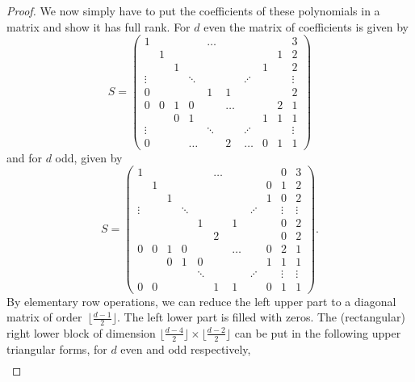 \documentclass[pdftex]{sigma}
\numberwithin{equation}{section}
\begin{document}
\begin{proof}
We now simply have to put the coefficients of these polynomials in a matrix and show it has full rank.
For $d$ even the matrix of coefficients is given by
\[S=
\begin{pmatrix}
1      &       &   &   & \dots&&         &   &  & 3\\
      & 1     &   &        & &&         &  & 1 & 2\\
	   &       & 1 &        & &&         & 1 &  & 2\\
\vdots &       &   & \ddots & && \iddots &   &   & \vdots \\
0	   &       &   &        &1&1&         &  &   & 2 \\
0 & 0 &1      & 0 &   &  		 \dots		&      	&   &   2& 1\\
  &  &0  & 1 &  &        	 			&      	& 1 & 1 &1\\
\vdots  & &       &   & \ddots &   	    		&  	 \iddots 	&  & 	   & \vdots\\
0 & &       & \dots   &   &   	 	 2 		&     \dots    &   0  & 1 & 1
\end{pmatrix}
\]
and for $d$ odd, given by
\[S=
	\begin{pmatrix}
1 &   & & & & \dots & & & & 0 & 3\\
  & 1 &   &  & &      &  &        & 0 & 1 & 2\\
	   &       & 1 &&        & &&         & 1 & 0 & 2\\
\vdots &       &   & \ddots& & && \iddots &   &  \vdots & \vdots \\
       &       &   &       & 1&&1&&& 0&2 \\
	   &       &   &        &&2&         &   &  &0 & 2 \\
0&0 &1      & 0 &   &  		 &\dots	 &      	&  0&   2& 1\\
  & &0      & 1 & 0 &       &			&      	& 1 & 1 &1\\
  & &       &   & \ddots &  &   		&  	 \iddots 	&  & 	  \vdots & \vdots\\
 0&0 &       &   &     	 	& 1&1 		&         &     0& 1& 1
\end{pmatrix}.
\]
By elementary row operations, we can reduce the left upper part to a diagonal matrix of order~$\big\lfloor \frac{d-1}{2}\big\rfloor$. The left lower part is filled with zeros. The (rectangular) right lower block of dimension $\big\lfloor \frac{d-4}{2}\big\rfloor\times \big\lfloor \frac{d-2}{2}\big\rfloor$ can be put in the following upper triangular forms, for $d$ even and odd respectively,
 \begin{gather*}

\end{gather*}
\end{proof}
\end{document}
